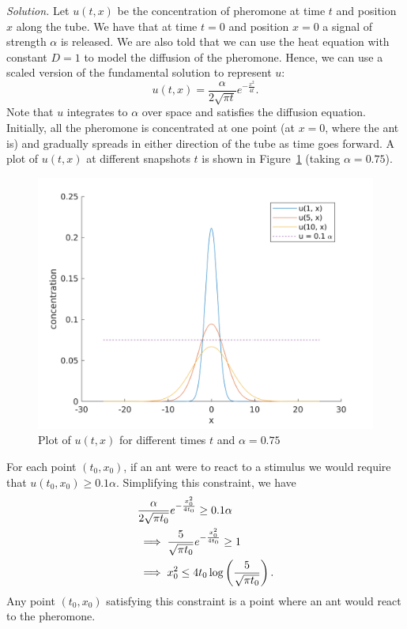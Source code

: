 \documentclass{article}
\begin{document}
\textit{Solution.}
Let $u(t, x)$ be the concentration of pheromone at time $t$ and position $x$
along the tube. We have that at time $t = 0$ and position $x = 0$ a signal
of strength $\alpha$ is released. We are also told that we can use
the heat equation with constant $D = 1$ to model the diffusion of the
pheromone. Hence, we can use a scaled version of the fundamental solution
to represent $u$:
%
\begin{equation*}
    u(t, x) = \frac{\alpha}{2 \sqrt{\pi t}} e^{-\frac{x^2}{4 t}}
    .
\end{equation*}
%
Note that $u$ integrates to $\alpha$ over space and satisfies the
diffusion equation. Initially, all the pheromone is concentrated
at one point (at $x = 0$, where the ant is) and gradually spreads
in either direction of the tube as time goes forward. A plot
of $u(t, x)$ at different snapshots $t$ is shown in Figure~\ref{fig:q453a}
(taking $\alpha = 0.75$).
%
\begin{figure}
    \includegraphics[width=5in]{q453a}
    \centering
    \caption{Plot of $u(t, x)$ for different times $t$ and $\alpha = 0.75$}
    \label{fig:q453a}
\end{figure}

For each point $(t_0, x_0)$, if an ant were to react to a stimulus
we would require that $u(t_0, x_0) \geq 0.1 \alpha$. Simplifying this
constraint, we have
%
\begin{align*}
    &\frac{\alpha}{2 \sqrt{\pi t_0}} e^{-\frac{x_0^2}{4 t_0}} \geq 0.1 \alpha \\
    &\implies \frac{5}{\sqrt{\pi t_0}} e^{-\frac{x_0^2}{4 t_0}} \geq 1 \\
    &\implies x_0^2 \leq 4 t_0 \log \del{\frac{5}{\sqrt{\pi t_0}}}
    .
\end{align*}
%
Any point $(t_0, x_0)$ satisfying this constraint is a point where an
ant would react to the pheromone.
\end{document}

